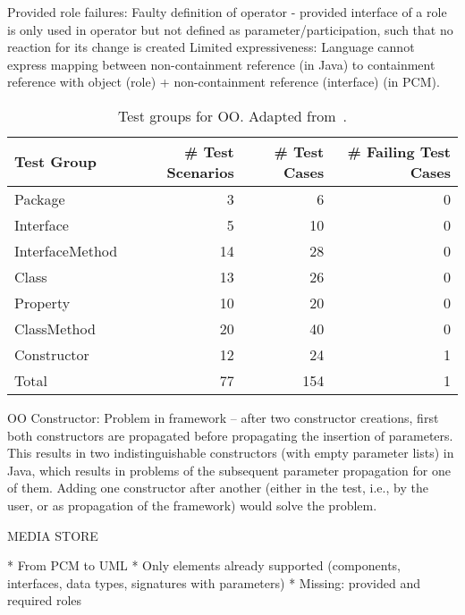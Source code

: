 Provided role failures: Faulty definition of operator - provided interface of a role is only used in operator but not defined as parameter/participation, such that no reaction for its change is created
Limited expressiveness: Language cannot express mapping between non-containment reference (in Java) to containment reference with object (role) + non-containment reference (interface) (in PCM).

\begin{table}[htb]
	\centering
		\begin{tabular}{lrrr}
			\toprule
			\multicolumn{1}{l}{\bfseries Test Group} & \multicolumn{1}{r}{\bfseries \# Test Scenarios} & \multicolumn{1}{r}{\bfseries \# Test Cases} & \multicolumn{1}{r}{\bfseries \# Failing Test Cases} \\
			\midrule
			Package 			& 3		& 6		& 0		 \\
			Interface 			& 5 	& 10	& 0		 \\
			InterfaceMethod 	& 14	& 28	& 0		 \\
			Class 				& 13	& 26	& 0		 \\
			Property 			& 10	& 20	& 0		 \\
			ClassMethod 		& 20	& 40	& 0		 \\
			Constructor 		& 12	& 24	& 1		 \\
			\midrule
			Total 				& 77	& 154	& 1		 \\
			\bottomrule
		\end{tabular}
	\caption{Test groups for OO. Adapted from~\cite[Table 10.2]{hennig2020ma}.}
	\label{tab:commonalities_evaluation:tests_oo}
\end{table}

OO Constructor: Problem in \vitruv framework -- after two constructor creations, first both constructors are propagated before propagating the insertion of parameters. This results in two indistinguishable constructors (with empty parameter lists) in Java, which results in problems of the subsequent parameter propagation for one of them.
Adding one constructor after another (either in the test, i.e., by the user, or as propagation of the framework) would solve the problem.


MEDIA STORE

* From PCM to UML
* Only elements already supported (components, interfaces, data types, signatures with parameters)
* Missing: provided and required roles


